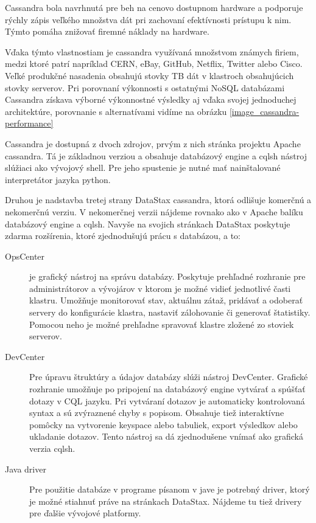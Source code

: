 	Cassandra bola navrhnutá pre beh na cenovo dostupnom hardware a podporuje rýchly zápis veľkého množstva dát pri zachovaní efektívnosti prístupu k nim. Týmto pomáha znižovať firemné náklady na hardware.
	
	Vďaka týmto vlastnostiam je cassandra využívaná množstvom známych firiem, medzi ktoré patrí napríklad CERN, eBay, GitHub, Netflix, Twitter alebo Cisco. Veľké produkčné nasadenia obsahujú stovky TB dát v klastroch obsahujúcich stovky serverov. Pri porovnaní výkonnosti s ostatnými NoSQL databázami  Cassandra získava výborné výkonnostné výsledky aj vďaka svojej jednoduchej architektúre, porovnanie s alternatívami vidíme na obrázku \ref{image_cassandra-performance}
	
	
	Cassandra je dostupná z dvoch zdrojov, prvým z nich stránka projektu Apache cassandra. Tá je základnou verziou a obsahuje databázový engine a cqlsh nástroj slúžiaci ako vývojový shell. Pre jeho spustenie je nutné mať nainštalované interpretátor jazyka python.
	
	Druhou je nadstavba tretej strany DataStax cassandra, ktorá odlišuje komerčnú a nekomerčnú verziu. V nekomerčnej verzii nájdeme rovnako ako v Apache balíku databázový engine a cqlsh. Navyše na svojich stránkach DataStax poskytuje zdarma rozšírenia, ktoré zjednodušujú prácu s databázou, a to:
	
	\begin{description}
		\item[OpsCenter] je grafický nástroj na správu databázy. Poskytuje prehľadné rozhranie pre administrátorov a vývojárov v ktorom je možné vidieť jednotlivé časti klastru. Umožňuje monitorovať stav, aktuálnu zátaž, pridávať a odoberať servery do konfigurácie klastra, nastaviť zálohovanie či generovať štatistiky. Pomocou neho je možné prehľadne spravovať klastre zložené zo stoviek serverov.

		\item[DevCenter] Pre úpravu štruktúry a údajov databázy slúži nástroj DevCenter. Grafické rozhranie umožňuje po pripojení na databázový engine vytvárať a spúšťať dotazy v CQL jazyku. Pri vytváraní dotazov je automaticky kontrolovaná syntax a sú zvýraznené chyby s popisom. 
		Obsahuje tiež interaktívne pomôcky na vytvorenie keyspace alebo tabuliek, export výsledkov alebo ukladanie dotazov.
		Tento nástroj sa dá zjednodušene vnímať ako grafická verzia cqlsh.

		\item[Java driver] Pre použitie databáze v programe písanom v jave je potrebný driver, ktorý je možné stiahnuť práve na stránkach DataStax. Nájdeme tu tiež drivery pre ďalšie vývojové platformy.
	\end{description}
	
